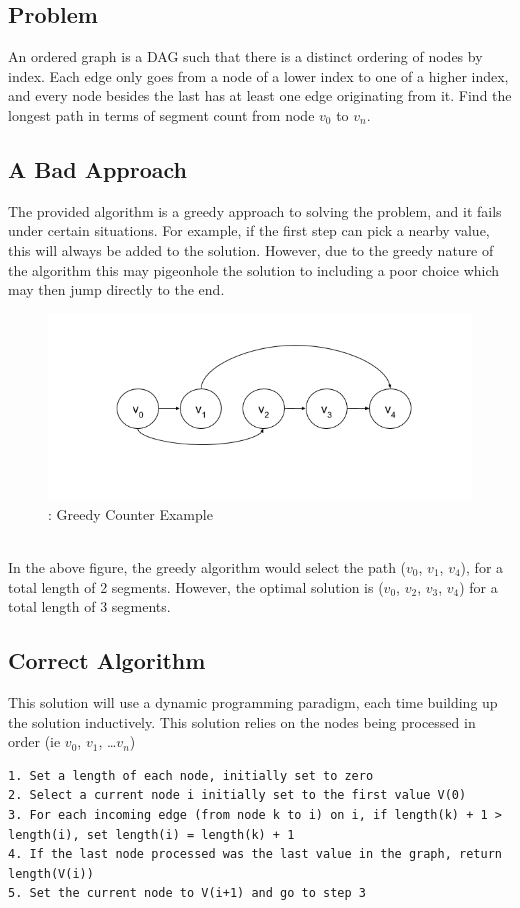 \documentclass[titlepage]{article}
\numberwithin{equation}{subsection}
\begin{document}
\subsection{Problem}
An ordered graph is a DAG such that there is a distinct ordering of nodes by index. Each edge only goes
from a node of a lower index to one of a higher index, and every node besides the last has at least one
edge originating from it. Find the longest path in terms of segment count from node $v_0$ to $v_n$.
\subsection{A Bad Approach}
The provided algorithm is a greedy approach to solving the problem, and it fails under certain situations.
For example, if the first step can pick a nearby value, this will always be added to the solution. However,
due to the greedy nature of the algorithm this may pigeonhole the solution to including a poor choice which
may then jump directly to the end. 
\begin{figure}
    \includegraphics[width=\linewidth]{counter2.png}
    \figurename{: Greedy Counter Example}
\end{figure}
\\
In the above figure, the greedy algorithm would select the path ($v_0$, $v_1$, $v_4$), for a total length of
2 segments. However, the optimal solution is ($v_0$, $v_2$, $v_3$, $v_4$) for a total length of 3 segments.
\subsection{Correct Algorithm}
This solution will use a dynamic programming paradigm, each time building up the solution inductively. This
solution relies on the nodes being processed in order (ie $v_0$, $v_1$, \dots $v_n$)
\begin{lstlisting}
1. Set a length of each node, initially set to zero
2. Select a current node i initially set to the first value V(0)
3. For each incoming edge (from node k to i) on i, if length(k) + 1 > length(i), set length(i) = length(k) + 1
4. If the last node processed was the last value in the graph, return length(V(i))
5. Set the current node to V(i+1) and go to step 3
\end{lstlisting}
\end{document}
